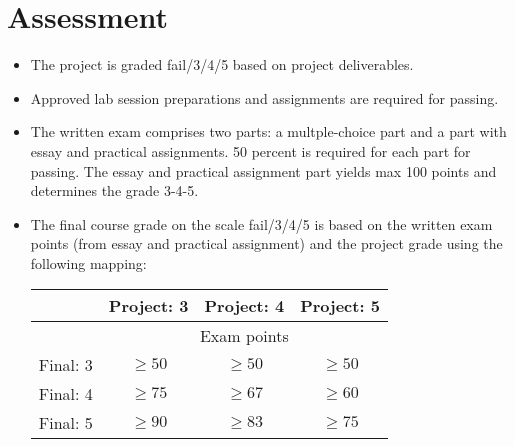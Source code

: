\section{Assessment}
\begin{itemize}
\item The project is graded fail/3/4/5 based on project deliverables.
\item Approved lab session preparations and assignments are required for passing.
\item The written exam comprises two parts: a multple-choice part and a part with essay and practical assignments. 50 percent is required for each part for passing. The essay and practical assignment part yields max 100 points and determines the grade 3-4-5.
\item The final course grade on the scale fail/3/4/5 is based on the written exam points (from essay and practical assignment) and the project grade using the following mapping: 

\begin{tabular}{r | c c c}
 & Project: 3 & Project: 4 & Project: 5 \\
\hline
 & \multicolumn{3}{c}{Exam points}    \\
Final: 3 & $ \geq 50$ & $\geq 50$ & $\geq 50$ \\
Final: 4 & $ \geq 75$ & $\geq 67$ & $\geq 60$ \\
Final: 5 & $ \geq 90$ & $\geq 83$ & $\geq 75$ \\
\hline
\end{tabular}


\end{itemize}

\ifteknolog\else
\newpage
\fi

